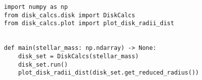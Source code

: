 \begin{lstlisting}
import numpy as np
from disk_calcs.disk import DiskCalcs
from disk_calcs.plot import plot_disk_radii_dist


def main(stellar_mass: np.ndarray) -> None:
    disk_set = DiskCalcs(stellar_mass)
    disk_set.run()
    plot_disk_radii_dist(disk_set.get_reduced_radius())
\end{lstlisting}